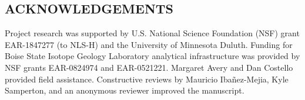 \documentclass[11pt,letterpaper]{article}
\begin{document}


\subsection*{ACKNOWLEDGEMENTS}
Project research was supported by U.S. National Science Foundation (NSF) grant EAR-1847277 (to NLS-H) and the University of Minnesota Duluth. Funding for Boise State Isotope Geology Laboratory analytical infrastructure was provided by NSF grants EAR-0824974 and EAR-0521221. Margaret Avery and Dan Costello provided field assistance. Constructive reviews by Mauricio Iba\~nez-Mejia, Kyle Samperton, and an anonymous reviewer improved the manuscript.
\footnotesize


\singlespacing



\end{document}
